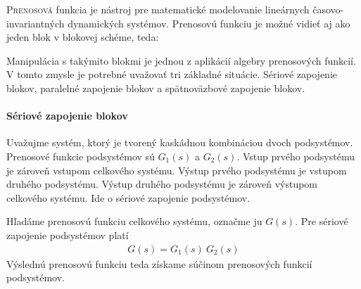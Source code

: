 \documentclass[a4paper, 10pt, ]{article}
\begin{document}
\bigskip

\normalsize
\normalfont












\noindent
\lettrine[lines=1, nindent=1pt, loversize=0.0]{P}{renosová} 
funkcia je nástroj pre matematické modelovanie lineárnych časovo-invariantných dynamických systémov. Prenosovú funkciu je možné vidieť aj ako jeden blok v blokovej schéme, teda:


\begin{center}

    \makebox[\textwidth][c]{%
    
    }

	\label{TFalgebra_lenG}

\end{center}

Manipulácia s takýmito blokmi je jednou z aplikácií algebry prenosových funkcií. V tomto zmysle je potrebné uvažovať tri základné situácie. Sériové zapojenie blokov, paralelné zapojenie blokov a spätnoväzbové zapojenie blokov.



\paragraph{Sériové zapojenie blokov}

Uvažujme systém, ktorý je tvorený kaskádnou kombináciou dvoch podsystémov. Prenosové funkcie podsystémov sú $G_1(s)$ a $G_2(s)$. Vstup prvého podsystému je zároveň vstupom celkového systému. Výstup prvého podsystému je vstupom druhého podsystému. Výstup druhého podsystému je zároveň výstupom celkového systému. Ide o sériové zapojenie podsystémov.

\begin{center}

    \makebox[\textwidth][c]{%
    
    }

	\label{TFalgebra_seriove}

\end{center}

Hľadáme prenosovú funkciu celkového systému, označme ju $G(s)$. Pre sériové zapojenie podsystémov platí
\begin{align}
    G(s) = G_1(s)\ G_2(s)
\end{align}
Výslednú prenosovú funkciu teda získame súčinom prenosových funkcií podsystémov.
\end{document}
